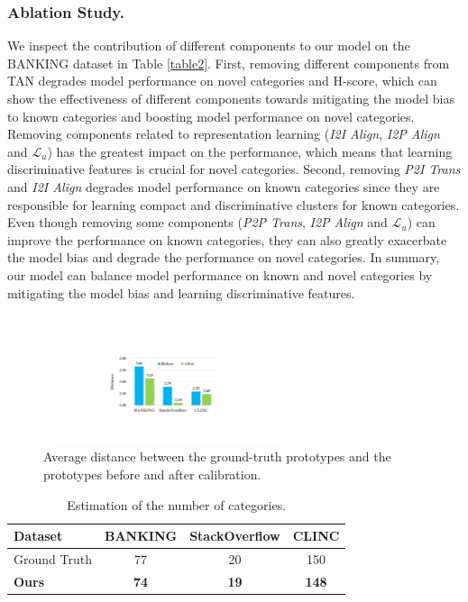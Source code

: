 \documentclass[letterpaper]{article} %
\begin{document}
\subsubsection{Ablation Study. }
We inspect the contribution of different components to our model on the BANKING dataset in Table \ref{table2}. First, removing different components from TAN degrades model performance on novel categories and H-score, which can show the effectiveness of different components towards mitigating the model bias to known categories and boosting model performance on novel categories. Removing components related to representation learning (\textit{I2I Align}, \textit{I2P Align} and $\mathcal{L}_{u}$) has the greatest impact on the performance, which means that learning discriminative features is crucial for novel categories. Second, removing \textit{P2I Trans} and \textit{I2I Align} degrades model performance on known categories since they are responsible for learning compact and discriminative clusters for known categories. Even though removing some components (\textit{P2P Trans}, \textit{I2P Align} and $\mathcal{L}_{u}$) can improve the performance on known categories, they can also greatly exacerbate the model bias and degrade the performance on novel categories. In summary, our model can balance model performance on known and novel categories by mitigating the model bias and learning discriminative features.


\begin{figure}
\centering
\includegraphics[width=7.5cm, height=3.8cm]{calibration.pdf}
\caption{Average distance between the ground-truth prototypes and the prototypes before and after calibration.}
\label{fig3}
\end{figure}


\begin{table}
\centering
\begin{tabular}{lccc}
\toprule
Dataset & BANKING  & StackOverflow  & CLINC \\
\midrule
Ground Truth       & 77    & 20 & 150\\
\textbf{Ours}               & \textbf{74}    & \textbf{19} & \textbf{148}\\
\bottomrule
\end{tabular}
\caption{Estimation of the number of categories.}
\label{table4}
\end{table}
\end{document}
